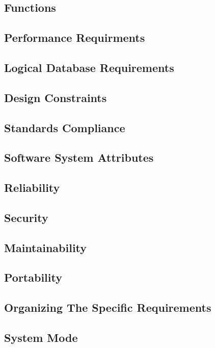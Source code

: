 \documentclass[draftclsnofoot, onecolumn, 10pt]{IEEEtran}
\begin{document}
\subsection{Functions}

\subsection{Performance Requirments}

\subsection{Logical Database Requirements}

\subsection{Design Constraints}

\subsection{Standards Compliance}

\subsection{Software System Attributes}

\subsection{Reliability}

\subsection{Security}

\subsection{Maintainability}

\subsection{Portability}

\subsection{Organizing The Specific Requirements}

\subsection{System Mode}
\end{document}
